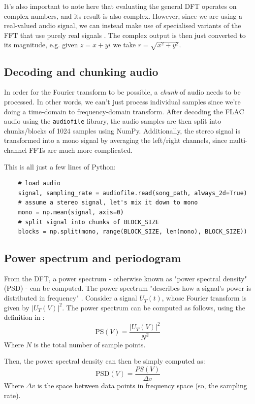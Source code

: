 \documentclass[11pt]{article}
\begin{document}
It's also important to note here that evaluating the general DFT operates on complex numbers, and its result
is also complex. However, since we are using a real-valued audio signal, we can instead make use of
specialised variants of the FFT that use purely real signals \cite{Sorensen1987}. The complex output is then
just converted to its magnitude, e.g. given $z = x + yi$ we take $r = \sqrt{x^2 + y^2}$.

\subsection{Decoding and chunking audio}
In order for the Fourier transform to be possible, a \textit{chunk} of audio needs to be processed. In other
words, we can't just process individual samples since we're doing a time-domain to frequency-domain
transform. After decoding the FLAC audio using the \verb|audiofile| library, the audio samples are then split
into chunks/blocks of 1024 samples using NumPy. Additionally, the stereo signal is transformed into a mono
signal by averaging the left/right channels, since multi-channel FFTs are much more complicated.

This is all just a few lines of Python:
\begin{verbatim}
    # load audio
    signal, sampling_rate = audiofile.read(song_path, always_2d=True)
    # assume a stereo signal, let's mix it down to mono
    mono = np.mean(signal, axis=0)
    # split signal into chunks of BLOCK_SIZE
    blocks = np.split(mono, range(BLOCK_SIZE, len(mono), BLOCK_SIZE))
\end{verbatim}

\subsection{Power spectrum and periodogram}
From the DFT, a power spectrum - otherwise known as "power spectral density" (PSD) - can be computed. The
power spectrum "describes how a signal's power is distributed in frequency" \cite{Youngworth2005}. Consider
a signal $U_T(t)$, whose Fourier transform is given by $|U_T(V)|^2$. The power spectrum can be computed as
follows, using the definition in \cite{Youngworth2005}:
$$\text{PS}(V) = \frac{|U_T(V)|^2}{N^2}$$
Where $N$ is the total number of sample points.

Then, the power spectral density can then be simply computed as:
$$\text{PSD}(V) = \frac{PS(V)}{\Delta v}$$
Where $\Delta v$ is the space between data points in frequency space (so, the sampling rate).
\end{document}
